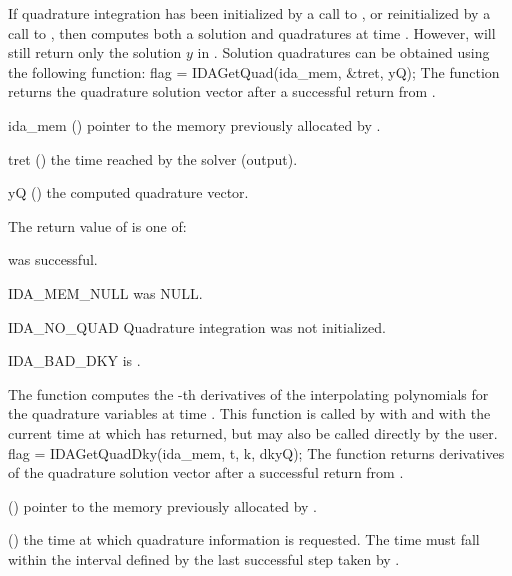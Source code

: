 {If quadrature integration has been initialized by a call to ,
or reinitialized by a call to , then {\idas} computes both a solution
and quadratures at time . However,  will still return only the solution
$y$ in . Solution quadratures can be obtained using the following function:
{
  flag = IDAGetQuad(ida\_mem, \&tret, yQ);
}
{
  The function  returns the quadrature solution vector after a
  successful return from .
}
{
  \begin{args}
  \item[ida\_mem] ()
    pointer to the memory previously allocated by .
  \item[tret] ()
    the time reached by the solver (output).
  \item[yQ] ()
    the computed quadrature vector.
  \end{args}
}
{
  The return value  of  is one of:
  \begin{args}
  \item[\Id{IDA\_SUCCESS}]
     was successful.
  \item[IDA\_MEM\_NULL]
     was NULL.
  \item[IDA\_NO\_QUAD]
    Quadrature integration was not initialized.
  \item[IDA\_BAD\_DKY]
     is .
  \end{args}
}
{}
The function  computes the -th derivatives of the interpolating
polynomials for the quadrature variables at time .
This function is called by  with  and with the current
time at which  has returned, but may also be called
directly by the user.
{
  flag = IDAGetQuadDky(ida\_mem, t, k, dkyQ);
}
{
  The function  returns derivatives of the quadrature solution
  vector after a successful return from .
}
{
  \begin{args}
  \item[\id{ida\_mem}] ()
    pointer to the memory previously allocated by .
  \item[\id{t}] ()
    the time at which quadrature information is
    requested. The time  must fall within the interval defined by the last
    successful step taken by {\idas}.

\end{args}}}
